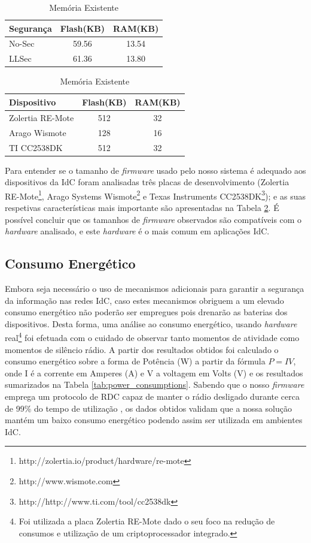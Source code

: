 \documentclass{llncs}
\begin{document}
\begin{table}
\parbox{.45\linewidth}{
\centering
\caption{Memória Utilizada}
\label{tab:space_req}
\begin{tabular}{|l|c|c|} \hline
Segurança&Flash(KB)&RAM(KB)\\ \hline
No-Sec& 59.56& 13.54\\ \hline
LLSec& 61.36& 13.80\\ 
\hline\end{tabular}
}
\hfill
\parbox{.50\linewidth}{
\centering
\caption{Memória Existente}
\label{tab:existing_space}
\begin{tabular}{|l|c|c|} \hline
Dispositivo&Flash(KB)&RAM(KB)\\ \hline
Zolertia RE-Mote& 512& 32\\ \hline
Arago Wismote& 128& 16\\ \hline
TI CC2538DK& 512 & 32\\
\hline\end{tabular}
}
\end{table}

Para entender se o tamanho de \textit{firmware} usado pelo nosso sistema é adequado aos dispositivos da \ac{IdC} foram analisadas três placas de desenvolvimento (Zolertia RE-Mote\footnote{http://zolertia.io/product/hardware/re-mote}, Arago Systems Wismote\footnote{http://www.wismote.com} e Texas Instruments CC2538DK\footnote{http://http://www.ti.com/tool/cc2538dk}); 
e as suas respetivas características mais importante são apresentadas na Tabela \ref{tab:existing_space}.
É possível concluir que os tamanhos de \textit{firmware} observados são compatíveis com o \textit{hardware} analisado, e este \textit{hardware} é o mais comum 
em aplicações \ac{IdC}.

\subsection{Consumo Energético}
Embora seja necessário o uso de mecanismos adicionais para garantir a segurança da informação nas redes \ac{IdC}, caso estes mecanismos obriguem a um elevado consumo energético não poderão ser empregues pois 
drenarão as baterias dos dispositivos. 
Desta forma, uma análise ao consumo energético, usando \textit{hardware} real\footnote{Foi utilizada a placa Zolertia RE-Mote dado o seu foco na redução de consumos e utilização de um criptoprocessador integrado.} foi efetuada com o cuidado de observar tanto momentos de atividade como momentos de silêncio rádio. A partir dos resultados obtidos foi calculado o consumo energético sobre a forma de Potência (W) a partir da fórmula $P = I  V$, onde I é a corrente em Amperes (A) e V a voltagem em Volts (V) e os resultados sumarizados na Tabela \ref{tab:power_consumptions}. 
Sabendo que o nosso \textit{firmware} emprega um protocolo de \ac{RDC} capaz de manter o rádio desligado durante cerca de 99\% do tempo de utilização \cite{Dunkels2011}, os dados obtidos validam que a nossa solução mantém um baixo consumo energético podendo assim ser utilizada em ambientes \ac{IdC}.
\end{document}
